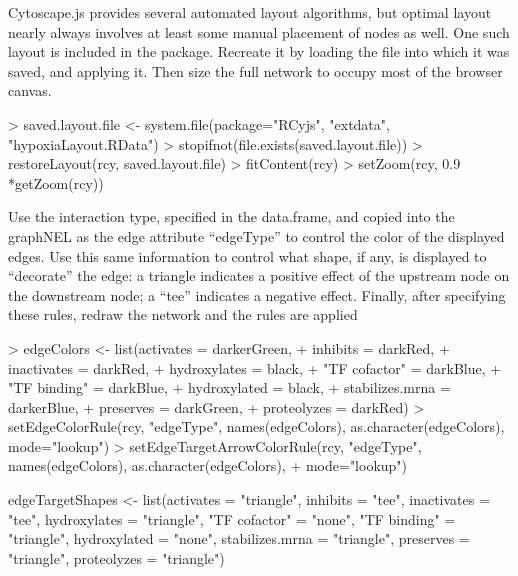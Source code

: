 \documentclass{article}
\begin{document}
Cytoscape.js provides several automated layout algorithms, but optimal layout nearly always involves 
at least some manual placement of nodes as well.  One such layout is included in the package. 
Recreate it by loading the file into which it was saved, and applying it.  Then size the
full network to occupy most of the browser canvas.

\begin{Schunk}
\begin{Sinput}
> saved.layout.file <- system.file(package="RCyjs", "extdata", "hypoxiaLayout.RData")
> stopifnot(file.exists(saved.layout.file))
> restoreLayout(rcy, saved.layout.file)
> fitContent(rcy)
> setZoom(rcy, 0.9 *getZoom(rcy))
\end{Sinput}
\end{Schunk}
Use the interaction type, specified in the  data.frame, and copied into the graphNEL as the 
edge attribute ``edgeType'' to control the color of the displayed edges.  Use this same information to
control what shape, if any, is displayed to ``decorate'' the edge:  a triangle indicates a positive 
effect of the upstream node on the downstream node; a ``tee'' indicates a negative effect.   Finally,
after specifying these rules, redraw the network and the rules are applied


\begin{Schunk}
\begin{Sinput}
> edgeColors <- list(activates = darkerGreen,
+                    inhibits = darkRed,
+                    inactivates = darkRed,
+                    hydroxylates = black,
+                    "TF cofactor" = darkBlue,
+                    "TF binding" = darkBlue,
+                    hydroxylated = black,
+                    stabilizes.mrna = darkerBlue,
+                    preserves = darkGreen,
+                    proteolyzes = darkRed)
> setEdgeColorRule(rcy, "edgeType", names(edgeColors), as.character(edgeColors), mode="lookup")
> setEdgeTargetArrowColorRule(rcy, "edgeType", names(edgeColors), as.character(edgeColors),
+                             mode="lookup")
\end{Sinput}
\end{Schunk}

edgeTargetShapes <- list(activates = "triangle",
                         inhibits = "tee",
                         inactivates = "tee",
                         hydroxylates = "triangle",
                         "TF cofactor" = "none",
                         "TF binding" = "triangle",
                         hydroxylated = "none",
                         stabilizes.mrna = "triangle",
                         preserves = "triangle",
                         proteolyzes = "triangle")
\end{document}
